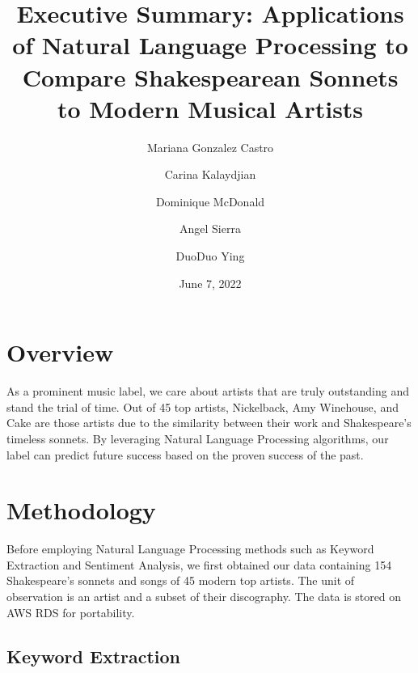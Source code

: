 \documentclass[10pt,a4paper]{article}
\title{Executive Summary: Applications of Natural Language Processing to Compare Shakespearean Sonnets to Modern Musical Artists}
\author[*]{Mariana Gonzalez Castro}
\author[*]{Carina Kalaydjian}
\author[*]{Dominique McDonald}
\author[*]{Angel Sierra}
\author[*]{DuoDuo Ying}
\affil[*]{Department of Statistics, UCLA}
\date{June 7, 2022}
\begin{document}
\maketitle

\section{Overview}

As a prominent music label, we care about artists that are truly outstanding and stand the trial of time. Out of 45 top artists, Nickelback, Amy Winehouse, and Cake are those artists due to the similarity between their work and Shakespeare's timeless sonnets. By leveraging Natural Language Processing algorithms, our label can predict future success based on the proven success of the past. 

\begin{table}[ht]
\centering
{}
\caption{Ranked Top 10 Most Similar Music Artist to Shakespeare} 
\label{tab:overallranktable}
\end{table}


\section{Methodology}

Before employing Natural Language Processing methods such as Keyword Extraction and Sentiment Analysis, we first obtained our data containing 154 Shakespeare's sonnets and songs of 45 modern top artists. The unit of observation is an artist and a subset of their discography. The data is stored on AWS RDS for portability.

\subsection{Keyword Extraction}
\end{document}
